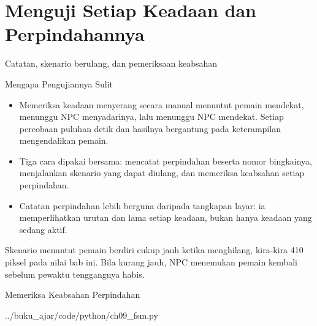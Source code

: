 \documentclass[aspectratio=169,10pt]{beamer}
\begin{document}
\section{Menguji Setiap Keadaan dan Perpindahannya}
  {Catatan, skenario berulang, dan pemeriksaan keabsahan}

\begin{frame}{Mengapa Pengujiannya Sulit}
\begin{itemize}
  \item Memeriksa keadaan menyerang secara manual menuntut pemain mendekat,
        menunggu NPC menyadarinya, lalu menunggu NPC mendekat. Setiap percobaan
        puluhan detik dan hasilnya bergantung pada keterampilan mengendalikan
        pemain.
  \item Tiga cara dipakai bersama: mencatat perpindahan beserta nomor
        bingkainya, menjalankan skenario yang dapat diulang, dan memeriksa
        keabsahan setiap perpindahan.
  \item Catatan perpindahan lebih berguna daripada tangkapan layar: ia
        memperlihatkan urutan dan lama setiap keadaan, bukan hanya keadaan yang
        sedang aktif.
\end{itemize}
\vspace{0.12cm}
\begin{kotak}
Skenario menuntut pemain berdiri cukup jauh ketika menghilang, kira-kira 410
piksel pada nilai bab ini. Bila kurang jauh, NPC menemukan pemain kembali
sebelum pewaktu tenggangnya habis.
\end{kotak}
\end{frame}

\begin{frame}[fragile]{Memeriksa Keabsahan Perpindahan}

  {../buku_ajar/code/python/ch09_fsm.py}
\end{frame}
\end{document}
